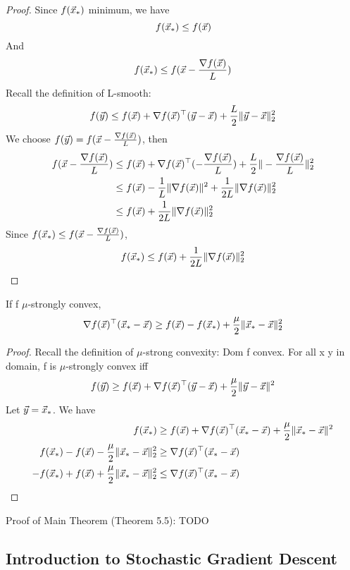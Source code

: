 \begin{proof}
	Since $f(\vec{x}_*)$ minimum, we have
	\[
f(\vec{x}_*) \le f(\vec{x})
	\]
	And
	\[
f(\vec{x}_*) \le f(\vec{x}-\frac{\nabla f(\vec{x})}{L})
	\]
Recall the definition of L-smooth:
\[
f(\vec{y})\le f(\vec{x})+\nabla f(\vec{x})^\top(\vec{y}-\vec{x}) + \frac{L}{2}\|\vec{y}-\vec{x}\|_2^2
\]
We choose $f(\vec{y}) = f(\vec{x}-\frac{\nabla f(\vec{x})}{L})$, then
\begin{align*}
	f(\vec{x}-\frac{\nabla f(\vec{x})}{L}) &\le f(\vec{x})+\nabla f(\vec{x})^\top(-\frac{\nabla f(\vec{x})}{L})+\frac{L}{2}\|-\frac{\nabla f(\vec{x})}{L}\|_2^2\\
	&\le f(\vec{x})-\frac{1}{L}\|\nabla f(\vec{x})\|^2+\frac{1}{2L}\|\nabla f(\vec{x})\|_2^2\\
	&\le f(\vec{x})+\frac{1}{2L}\|\nabla f(\vec{x})\|_2^2\\
\end{align*}
Since $f(\vec{x}_*) \le f(\vec{x}-\frac{\nabla f(\vec{x})}{L})$,
\begin{align*}
	f(\vec{x}_*) \le f(\vec{x})+\frac{1}{2L}\|\nabla f(\vec{x})\|_2^2
\end{align*}
\end{proof}

\begin{lemma}
	If f $\mu$-strongly convex,
	\[
	\nabla f(\vec{x})^\top(\vec{x}_*-\vec{x}) \ge f(\vec{x}) - f(\vec{x}_*) + \frac{\mu}{2}\|\vec{x}_*-\vec{x}\|_2^2 
	\]
\end{lemma}

\begin{proof}
	Recall the definition of $\mu$-strong convexity: Dom f convex. For all x y in domain, f is $\mu$-strongly convex iff
	\[
f(\vec{y})\ge f(\vec{x})+\nabla f(\vec{x})^\top(\vec{y}-\vec{x}) + \frac{\mu}{2}\|\vec{y}-\vec{x}\|^2
	\]
	Let $\vec{y} = \vec{x}_*$. We have
	\begin{align*}
		f(\vec{x}_*) &\ge f(\vec{x})+\nabla f(\vec{x})^\top(\vec{x}_*-\vec{x}) + \frac{\mu}{2}\|\vec{x}_*-\vec{x}\|^2\\
		f(\vec{x}_*) - f(\vec{x}) - \frac{\mu}{2}\|\vec{x}_*-\vec{x}\|_2^2 &\ge \nabla f(\vec{x})^\top(\vec{x}_*-\vec{x})\\
		- f(\vec{x}_*) + f(\vec{x}) + \frac{\mu}{2}\|\vec{x}_*-\vec{x}\|_2^2 &\le \nabla f(\vec{x})^\top(\vec{x}_*-\vec{x})
	\end{align*}
\end{proof}

Proof of Main Theorem (Theorem 5.5): TODO


\subsection{Introduction to Stochastic Gradient Descent} %
\label{sub:introduction_to_stochastic_gradient_descent}

